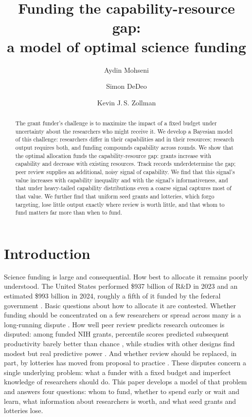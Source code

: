 \documentclass[article, 11pt, reqno]{amsart}
\title[Funding the capability-resource gap]{Funding the capability-resource gap:\\ a model of optimal science funding}
\author{Aydin Mohseni}
\author{Simon DeDeo}
\author{Kevin J.\,S. Zollman}
\theoremstyle{named}
\begin{document}
\begin{abstract}
The grant funder's challenge is to maximize the impact of a fixed budget under uncertainty about the researchers who might receive it. We develop a Bayesian model of this challenge: researchers differ in their capabilities and in their resources; research output requires both, and funding compounds capability across rounds. We show that the optimal allocation funds the capability-resource gap: grants increase with capability and decrease with existing resources. Track records underdetermine the gap; peer review supplies an additional, noisy signal of capability. We find that this signal's value increases with capability inequality and with the signal's informativeness, and that under heavy-tailed capability distributions even a coarse signal captures most of that value. We further find that uniform seed grants and lotteries, which forgo targeting, lose little output exactly where review is worth little, and that whom to fund matters far more than when to fund.
\end{abstract}

\maketitle

\section{Introduction}\label{sec:intro}

Science funding is large and consequential. How best to allocate it remains poorly understood. The United States performed \$937 billion of R\&D in 2023 and an estimated \$993 billion in 2024, roughly a fifth of it funded by the federal government \citep{NCSES2026, NSB2026}. Basic questions about how to allocate it are contested. Whether funding should be concentrated on a few researchers or spread across many is a long-running dispute \citep{Aagaard2020}. How well peer review predicts research outcomes is disputed: among funded NIH grants, percentile scores predicted subsequent productivity barely better than chance \citep{Fang2016}, while studies with other designs find modest but real predictive power \citep{Gallo2014, LiAgha2015, ParkLeeKim2015}. %
And whether review should be replaced, in part, by lotteries has moved from proposal to practice \citep{Roumbanis2019, Heyard2022}. %
These disputes concern a single underlying problem: what a funder with a fixed budget and imperfect knowledge of researchers should do. This paper develops a model of that problem and answers four questions: whom to fund, whether to spend early or wait and learn, what information about researchers is worth, and what seed grants and lotteries lose.
\end{document}
